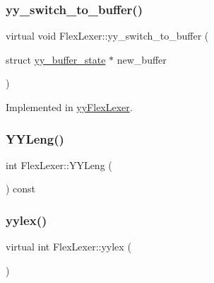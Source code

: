 \mbox{\label{classFlexLexer_a3fa4649c1866a483fc391923ca90ca1d}} 
\subsubsection{\texorpdfstring{yy\+\_\+switch\+\_\+to\+\_\+buffer()}{yy\_switch\_to\_buffer()}}
{\footnotesize\ttfamily virtual void Flex\+Lexer\+::yy\+\_\+switch\+\_\+to\+\_\+buffer (\begin{DoxyParamCaption}\item[{struct \hyperlink{structyy__buffer__state}{yy\+\_\+buffer\+\_\+state} $\ast$}]{new\+\_\+buffer }\end{DoxyParamCaption})\hspace{0.3cm}{\ttfamily [pure virtual]}}



Implemented in \hyperlink{classyyFlexLexer_ad1d304c93cf758e1ae4db98d9ca35ad0}{yy\+Flex\+Lexer}.

\mbox{\label{classFlexLexer_aad615c6bce162fcc98c07d69371f6117}} 
\subsubsection{\texorpdfstring{Y\+Y\+Leng()}{YYLeng()}}
{\footnotesize\ttfamily int Flex\+Lexer\+::\+Y\+Y\+Leng (\begin{DoxyParamCaption}{ }\end{DoxyParamCaption}) const\hspace{0.3cm}{\ttfamily [inline]}}

\mbox{\label{classFlexLexer_a1b1f93d24f5a97f50eb1747fac568ccb}} 
\subsubsection{\texorpdfstring{yylex()}{yylex()}\hspace{0.1cm}{\footnotesize\ttfamily [1/2]}}
{\footnotesize\ttfamily virtual int Flex\+Lexer\+::yylex (\begin{DoxyParamCaption}{ }\end{DoxyParamCaption})\hspace{0.3cm}{\ttfamily [pure virtual]}}



